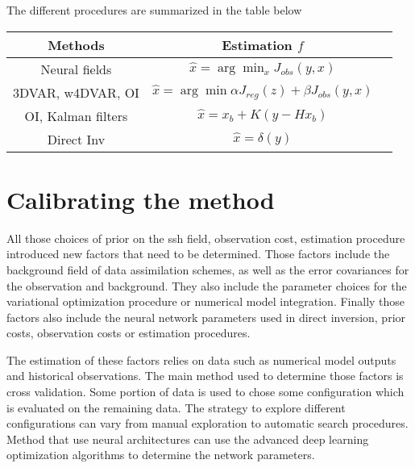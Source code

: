 \begin{bibunit}
The different procedures are summarized in the table below

\begin{table}
  \begin{tabular}{|c|c|c|}
\hline
    Methods & Estimation $f$ \\
\hline
    Neural fields & $\hat{x} = \arg\min_x J_{obs}(y, x)$ \\
\hline
    3DVAR, w4DVAR, OI & $\hat{x} = \arg\min \alpha J_{reg}(z) + \beta J_{obs}(y, x)$ \\
\hline
    OI, Kalman filters & $\hat{x} = x_b + K(y - Hx_b)$ \\
\hline
    Direct Inv & $\hat{x} = \delta(y)$ \\
\hline
\end{tabular}

\end{table}

%




\section{Calibrating the method}
All those choices of prior on the ssh field, observation cost, estimation procedure introduced new factors that need to be determined.
Those factors include the background field of data assimilation schemes, as well as the error covariances for the observation and background. They also include the parameter choices for the variational optimization procedure or numerical model integration. Finally those factors also include the neural network parameters used in direct inversion, prior costs, observation costs or estimation procedures.

The estimation of these factors relies on data such as numerical model outputs and historical observations.
The main method used to determine those factors is cross validation. Some portion of data is used to chose some configuration which is evaluated on the remaining data. The strategy to explore different configurations can vary from manual exploration to automatic search procedures. 
Method that use neural architectures can use the advanced deep learning optimization algorithms to determine the network parameters.


\end{bibunit}
